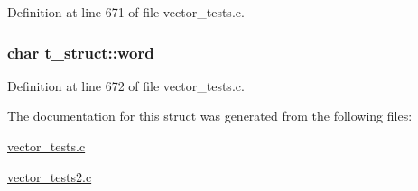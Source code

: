 Definition at line 671 of file vector\-\_\-tests.\-c.

\hypertarget{structt__struct_af32b8acd2bade0a8ceb0aa9400a34daa}{
\subsubsection[{word}]{\setlength{\rightskip}{0pt plus 5cm}char t\-\_\-struct\-::word}}\label{structt__struct_af32b8acd2bade0a8ceb0aa9400a34daa}


Definition at line 672 of file vector\-\_\-tests.\-c.



The documentation for this struct was generated from the following files\-:\begin{DoxyCompactItemize}
\item 
\hyperlink{vector__tests_8c}{vector\-\_\-tests.\-c}\item 
\hyperlink{vector__tests2_8c}{vector\-\_\-tests2.\-c}\end{DoxyCompactItemize}
